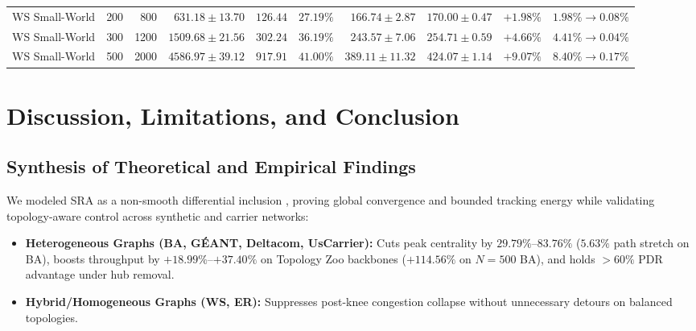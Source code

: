 \documentclass{ccjnl}
\newcommand{\rev}[1]{{\color{blue}#1}}
\def\rev#1{#1}%
\begin{document}
\begin{table}[t]
\begin{tabular*}{\textwidth}{@{\extracolsep{\fill}}lrrrrrrrrr@{}}
WS Small-World & 200 & 800 & $631.18 \pm 13.70$ & $126.44$ & $27.19\%$ & $166.74 \pm 2.87$ & $170.00 \pm 0.47$ & $+1.98\%$ & $1.98\% \to 0.08\%$ \\
WS Small-World & 300 & 1200 & $1509.68 \pm 21.56$ & $302.24$ & $36.19\%$ & $243.57 \pm 7.06$ & $254.71 \pm 0.59$ & $+4.66\%$ & $4.41\% \to 0.04\%$ \\
WS Small-World & 500 & 2000 & $4586.97 \pm 39.12$ & $917.91$ & $41.00\%$ & $389.11 \pm 11.32$ & $424.07 \pm 1.14$ & $+9.07\%$ & $8.40\% \to 0.17\%$ \\
\bottomrule
\end{tabular*}
\end{table}

\section{Discussion, \rev{Limitations,} and Conclusion}
\label{sec:discussion_conclusion}

\subsection{\rev{Synthesis of Theoretical and Empirical Findings}}
We modeled SRA as a non-smooth differential inclusion \cite{Aubin1984Differential}, proving global convergence and bounded tracking energy while validating topology-aware control across synthetic and carrier networks:
\begin{itemize}
    \item \textbf{Heterogeneous Graphs (BA, G\'EANT, Deltacom, UsCarrier):} Cuts peak centrality by $29.79\%$--$83.76\%$ ($5.63\%$ path stretch on BA), boosts throughput by $+18.99\%$--$+37.40\%$ on Topology Zoo backbones ($+114.56\%$ on $N=500$ BA), and holds $>60\%$ PDR advantage under hub removal.
    \item \textbf{Hybrid/Homogeneous Graphs (WS, ER):} Suppresses post-knee congestion collapse without unnecessary detours on balanced topologies.
\end{itemize}
\end{document}
